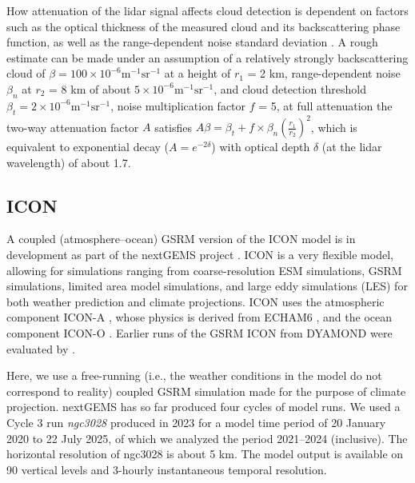 \documentclass[draft]{agujournal2019}
\begin{document}
How attenuation of the lidar signal affects cloud detection is dependent on factors such as the optical thickness of the measured cloud and its backscattering phase function, as well as the range-dependent noise standard deviation \cite{kuma2021}. A rough estimate can be made under an assumption of a relatively strongly backscattering cloud of $\beta = \mathrm{100\times 10^{-6} m^{-1}sr^{-1}}$ at a height of $r_1$ = 2 km, range-dependent noise $\beta_n$ at $r_2$ = 8 km of about $\mathrm{5\times 10^{-6} m^{-1}sr^{-1}}$, and cloud detection threshold $\beta_t = \mathrm{2\times 10^{-6} m^{-1}sr^{-1}}$, noise multiplication factor $f$ = 5, at full attenuation the two-way attenuation factor $A$ satisfies $A\beta = \beta_t + f\times \beta_n\left(\frac{r_1}{r_2}\right)^2$, which is equivalent to exponential decay ($A = e^{-2\delta}$) with optical depth $\delta$ (at the lidar wavelength) of about 1.7.

\subsection{ICON}
\label{sec:icon}

A coupled (atmosphere–ocean) GSRM version of the ICON model is in development as part of the nextGEMS project \cite{hohenegger2023}. ICON is a very flexible model, allowing for simulations ranging from coarse-resolution ESM simulations, GSRM simulations, limited area model simulations, and large eddy simulations (LES) for both weather prediction and climate projections. ICON uses the atmospheric component ICON-A \cite{giorgetta2018}, whose physics is derived from ECHAM6 \cite{stevens2013}, and the ocean component ICON-O \cite{korn2022}. Earlier runs of the GSRM ICON from DYAMOND were evaluated by .

Here, we use a free-running (i.e., the weather conditions in the model do not correspond to reality) coupled GSRM simulation made for the purpose of climate projection. nextGEMS has so far produced four cycles of model runs. We used a Cycle 3 run \emph{ngc3028} produced in 2023 \cite{nextgems2023a,nextgems2023b} for a model time period of 20 January 2020 to 22 July 2025, of which we analyzed the period 2021–2024 (inclusive). The horizontal resolution of ngc3028 is about 5 km. The model output is available on 90 vertical levels and 3-hourly instantaneous temporal resolution.
\end{document}
